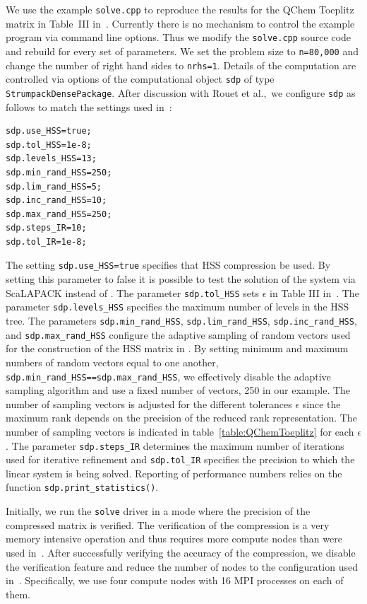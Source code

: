 \documentclass{acmsmall}
\begin{document}
We use the example \verb!solve.cpp! to reproduce the results for
the QChem Toeplitz matrix in Table~III in~\cite{rouet:strumpack}.
Currently there is no mechanism to control the example program
via command line options.  Thus we modify the \verb!solve.cpp!
source code and rebuild for every set of parameters.  We set the
problem size to \verb!n=80,000! and change the number of right
hand sides to \verb!nrhs=1!.  Details of the computation are
controlled via options of the computational object \verb!sdp! of
type \verb!StrumpackDensePackage!.  After discussion with Rouet
et al.,\ we configure \verb!sdp! as follows to match the settings
used in~\cite{rouet:strumpack}:
\begin{verbatim}
sdp.use_HSS=true;
sdp.tol_HSS=1e-8;
sdp.levels_HSS=13;
sdp.min_rand_HSS=250;
sdp.lim_rand_HSS=5;
sdp.inc_rand_HSS=10;
sdp.max_rand_HSS=250;
sdp.steps_IR=10;
sdp.tol_IR=1e-8;
\end{verbatim}
The setting \verb!sdp.use_HSS=true! specifies that HSS
compression be used.  By setting this parameter to false it is
possible to test the solution of the system via ScaLAPACK instead
of \strumpack{}.  The parameter \verb!sdp.tol_HSS! sets
$\epsilon$ in Table III in~\cite{rouet:strumpack}.  The parameter
\verb!sdp.levels_HSS! specifies the maximum number of levels in
the HSS tree.  The parameters \verb!sdp.min_rand_HSS!,
\verb!sdp.lim_rand_HSS!, \verb!sdp.inc_rand_HSS!, and
\verb!sdp.max_rand_HSS! configure the adaptive sampling of random
vectors used for the construction of the HSS matrix in
\strumpack{}.  By setting minimum and maximum numbers of random
vectors equal to one another,
\verb!sdp.min_rand_HSS==sdp.max_rand_HSS!, we effectively disable
the adaptive sampling algorithm and use a fixed number of
vectors, 250 in our example.  The number of sampling vectors is
adjusted for the different tolerances $\epsilon$ since the
maximum rank depends on the precision of the reduced rank
representation.  The number of sampling vectors is indicated in
table~\ref{table:QChemToeplitz} for each $\epsilon$.  The
parameter \verb!sdp.steps_IR! determines the maximum number of
iterations used for iterative refinement and \verb!sdp.tol_IR!
specifies the precision to which the linear system is being
solved.  Reporting of performance numbers relies on the function
\verb!sdp.print_statistics()!.

Initially, we run the \verb!solve! driver in a mode where the
precision of the compressed matrix is verified.  The verification
of the compression is a very memory intensive operation and thus
requires more compute nodes than were used
in~\cite{rouet:strumpack}.  After successfully verifying the
accuracy of the compression, we disable the verification feature
and reduce the number of nodes to the configuration used
in~\cite{rouet:strumpack}.  Specifically, we use four compute
nodes with 16 MPI processes on each of them.
\end{document}
